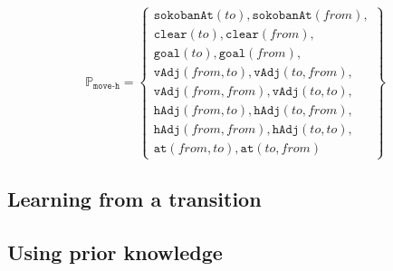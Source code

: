 \documentclass[../Master.tex]{subfiles}
\providecommand{\master}{..}
\begin{document}
\begin{example}
    \begin{equation*}
    \mathbb{P}_{\texttt{move-h}} =
    \left\{
        \begin{gathered}
            \texttt{sokobanAt}(to), \texttt{sokobanAt}(from), \\
            \texttt{clear}(to), \texttt{clear}(from), \\
            \texttt{goal}(to), \texttt{goal}(from), \\
            \texttt{vAdj}(from, to), \texttt{vAdj}(to, from), \\
            \texttt{vAdj}(from, from), \texttt{vAdj}(to, to), \\
            \texttt{hAdj}(from, to), \texttt{hAdj}(to, from), \\
            \texttt{hAdj}(from, from), \texttt{hAdj}(to, to), \\
            \texttt{at}(from, to), \texttt{at}(to, from)
        \end{gathered}
    \right\}
    \end{equation*}
\end{example}

\subsection{Learning from a transition}


\subsection{Using prior knowledge}

\end{document}
